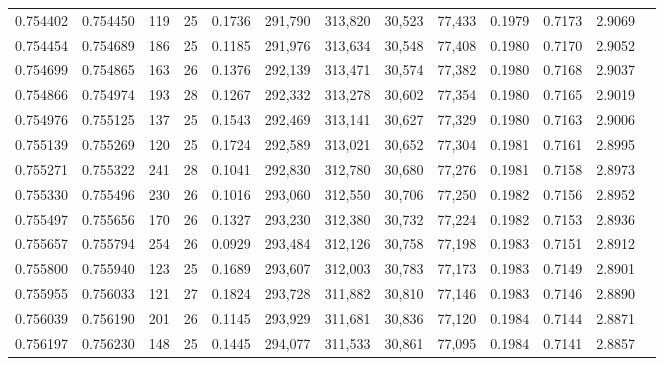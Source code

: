 \begin{tabular}{rrrrrrrrrrrrr}
0.754402 & 0.754450 &   119 &  25 &                                     0.1736 & 291,790 & 313,820 &  30,523 &  77,433 & 0.1979 & 0.7173 & 2.9069 \\
0.754454 & 0.754689 &   186 &  25 &                                     0.1185 & 291,976 & 313,634 &  30,548 &  77,408 & 0.1980 & 0.7170 & 2.9052 \\
0.754699 & 0.754865 &   163 &  26 &                                     0.1376 & 292,139 & 313,471 &  30,574 &  77,382 & 0.1980 & 0.7168 & 2.9037 \\
0.754866 & 0.754974 &   193 &  28 &                                     0.1267 & 292,332 & 313,278 &  30,602 &  77,354 & 0.1980 & 0.7165 & 2.9019 \\
0.754976 & 0.755125 &   137 &  25 &                                     0.1543 & 292,469 & 313,141 &  30,627 &  77,329 & 0.1980 & 0.7163 & 2.9006 \\
0.755139 & 0.755269 &   120 &  25 &                                     0.1724 & 292,589 & 313,021 &  30,652 &  77,304 & 0.1981 & 0.7161 & 2.8995 \\
0.755271 & 0.755322 &   241 &  28 &                                     0.1041 & 292,830 & 312,780 &  30,680 &  77,276 & 0.1981 & 0.7158 & 2.8973 \\
0.755330 & 0.755496 &   230 &  26 &                                     0.1016 & 293,060 & 312,550 &  30,706 &  77,250 & 0.1982 & 0.7156 & 2.8952 \\
0.755497 & 0.755656 &   170 &  26 &                                     0.1327 & 293,230 & 312,380 &  30,732 &  77,224 & 0.1982 & 0.7153 & 2.8936 \\
0.755657 & 0.755794 &   254 &  26 &                                     0.0929 & 293,484 & 312,126 &  30,758 &  77,198 & 0.1983 & 0.7151 & 2.8912 \\
0.755800 & 0.755940 &   123 &  25 &                                     0.1689 & 293,607 & 312,003 &  30,783 &  77,173 & 0.1983 & 0.7149 & 2.8901 \\
0.755955 & 0.756033 &   121 &  27 &                                     0.1824 & 293,728 & 311,882 &  30,810 &  77,146 & 0.1983 & 0.7146 & 2.8890 \\
0.756039 & 0.756190 &   201 &  26 &                                     0.1145 & 293,929 & 311,681 &  30,836 &  77,120 & 0.1984 & 0.7144 & 2.8871 \\
0.756197 & 0.756230 &   148 &  25 &                                     0.1445 & 294,077 & 311,533 &  30,861 &  77,095 & 0.1984 & 0.7141 & 2.8857 \\

\end{tabular}
